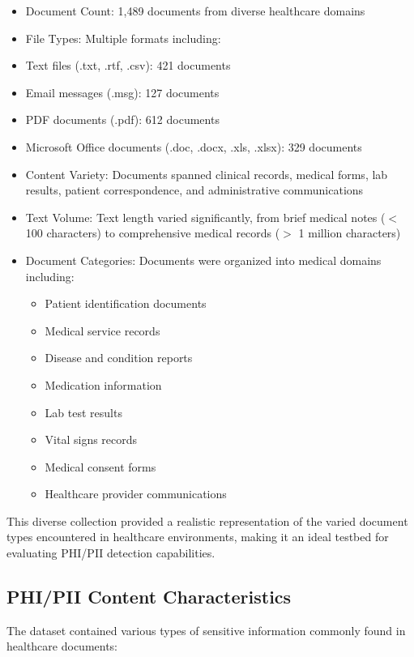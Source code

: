 \documentclass[conference]{IEEEtran}
\begin{document}
\begin{itemize}
\item Document Count: 1,489 documents from diverse healthcare domains
\item File Types: Multiple formats including:
\item Text files (.txt, .rtf, .csv): 421 documents
\item Email messages (.msg): 127 documents
\item PDF documents (.pdf): 612 documents
\item Microsoft Office documents (.doc, .docx, .xls, .xlsx): 329 documents
\item Content Variety: Documents spanned clinical records, medical forms, lab results, patient correspondence, and administrative communications
\item Text Volume: Text length varied significantly, from brief medical notes ($<$ 100 characters) to comprehensive medical records ($>$ 1 million characters)
\item Document Categories: Documents were organized into medical domains including:
\begin{itemize}
\item   Patient identification documents
\item   Medical service records
\item   Disease and condition reports
\item   Medication information
\item   Lab test results
\item   Vital signs records
\item   Medical consent forms
\item   Healthcare provider communications
\end{itemize}
\end{itemize}
This diverse collection provided a realistic representation of the varied document types encountered in healthcare environments, making it an ideal testbed for evaluating PHI/PII detection capabilities.

\subsection{\textbf{PHI/PII Content Characteristics}}
The dataset contained various types of sensitive information commonly found in healthcare documents:
\end{document}
